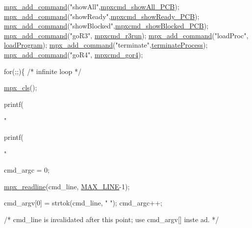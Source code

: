 \begin{DoxyCode}
        \hyperlink{_m_p_x___c_m_d_8_c_a52c02eb85fda9ac4278e10088a192e89}{mpx_add_command}(\textcolor{stringliteral}{"showAll"},\hyperlink{mpx__r2_8c_a69559f93fe1b569abf6e846a426191a9}{mpxcmd_showAll_PCB});
        \hyperlink{_m_p_x___c_m_d_8_c_a52c02eb85fda9ac4278e10088a192e89}{mpx_add_command}(\textcolor{stringliteral}{"showReady"},\hyperlink{mpx__r2_8c_aeaac6d37294f767e31c3789971c5ecd4}{mpxcmd_showReady_PCB});
        \hyperlink{_m_p_x___c_m_d_8_c_a52c02eb85fda9ac4278e10088a192e89}{mpx_add_command}(\textcolor{stringliteral}{"showBlocked"},\hyperlink{mpx__r2_8c_ae1ef92a5e3a8869ec269a23b3b854c9b}{mpxcmd_showBlocked_PCB});
        \hyperlink{_m_p_x___c_m_d_8_c_a52c02eb85fda9ac4278e10088a192e89}{mpx_add_command}(\textcolor{stringliteral}{"goR3"}, \hyperlink{mpx__r3_8c_a204c76cc251c17612164688f0b1272ad}{mpxcmd_r3run});
        \hyperlink{_m_p_x___c_m_d_8_c_a52c02eb85fda9ac4278e10088a192e89}{mpx_add_command}(\textcolor{stringliteral}{"loadProc"}, \hyperlink{mpx__r4_8c_a794e5f6c45d4d9b18fff6a530ce90f86}{loadProgram});
        \hyperlink{_m_p_x___c_m_d_8_c_a52c02eb85fda9ac4278e10088a192e89}{mpx_add_command}(\textcolor{stringliteral}{"terminate"},\hyperlink{mpx__r4_8c_aaa714b85ce262f949d018430daf6da00}{terminateProcess});
        \hyperlink{_m_p_x___c_m_d_8_c_a52c02eb85fda9ac4278e10088a192e89}{mpx_add_command}(\textcolor{stringliteral}{"goR4"}, \hyperlink{mpx__r3_8c_afff189bf2a21f1da2a30be81b57da08d}{mpxcmd_gor4});

        \textcolor{keywordflow}{for}(;;)\{ \textcolor{comment}{/* infinite loop */}

                \hyperlink{mpx__util_8c_a8cf3281978ba1652fd5d643e1a41f70b}{mpx_cls}();

                printf(\textcolor{stringliteral}{"%

                printf(\textcolor{stringliteral}{"%

                cmd\_argc = 0;

                \hyperlink{mpx__util_8c_a781169ab05ad54c0d37253d73060b77f}{mpx_readline}(cmd\_line, \hyperlink{mpx__cmd_8h_a842ed03f27719bc87666bfd1f75415b8}{MAX_LINE}-1);     

                cmd\_argv[0] = strtok(cmd\_line, \textcolor{stringliteral}{" "}); 
                cmd\_argc++;

                \textcolor{comment}{/* cmd\_line is invalidated after this point; use cmd\_argv[] inste
      ad. */}

}}
\end{DoxyCode}
